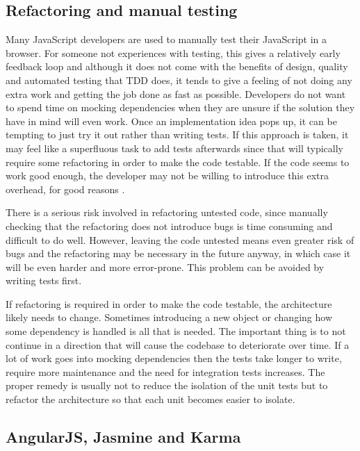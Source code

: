 \documentclass[11pt]{article}
\begin{document}
\subsection{Refactoring and manual testing}

Many JavaScript developers are used to manually test their JavaScript in a browser. For someone not experiences with testing, this gives a relatively early feedback loop and although it does not come with the benefits of design, quality and automated testing that TDD does, it tends to give a feeling of not doing any extra work and getting the job done as fast as possible. Developers do not want to spend time on mocking dependencies when they are unsure if the solution they have in mind will even work. Once an implementation idea pops up, it can be tempting to just try it out rather than writing tests. If this approach is taken, it may feel like a superfluous task to add tests afterwards since that will typically require some refactoring in order to make the code testable. If the code seems to work good enough, the developer may not be willing to introduce this extra overhead, for good reasons \cite[question~43]{Stenmark}.

There is a serious risk involved in refactoring untested code\cite[p.~17]{Refactoring}, since manually checking that the refactoring does not introduce bugs is time consuming and difficult to do well. However, leaving the code untested means even greater risk of bugs and the refactoring may be necessary in the future anyway, in which case it will be even harder and more error-prone. This problem can be avoided by writing tests first.

If refactoring is required in order to make the code testable, the architecture likely needs to change. Sometimes introducing a new object or changing how some dependency is handled is all that is needed. The important thing is to not continue in a direction that will cause the codebase to deteriorate over time. \cite[question~34]{Stenmark} If a lot of work goes into mocking dependencies then the tests take longer to write, require more maintenance and the need for integration tests increases. The proper remedy is usually not to reduce the isolation of the unit tests but to refactor the architecture so that each unit becomes easier to isolate. \cite[question~42]{Stenmark}

\subsection{AngularJS, Jasmine and Karma}
\end{document}
